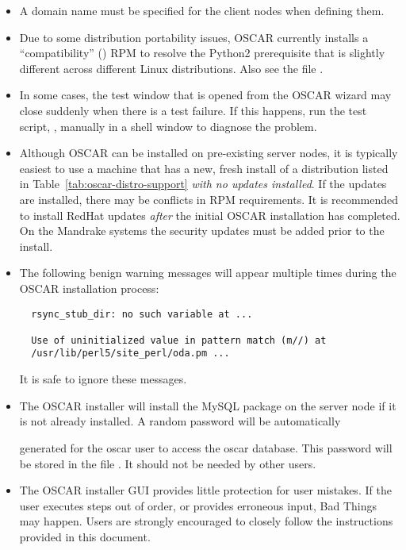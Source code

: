 \begin{itemize}
\item A domain name must be specified for the client nodes when
  defining them.

\item Due to some distribution portability issues, OSCAR currently installs
  a ``compatibility''  () RPM to resolve the
  Python2 prerequisite that is slightly different across different Linux
  distributions.  Also see the file .

\item In some cases, the test window that is opened from the
  OSCAR wizard may close suddenly when there is a test failure. If
  this happens, run the test script, ,
  manually in a shell window to diagnose the problem.

\item Although OSCAR can be installed on pre-existing server nodes, it
  is typically easiest to use a machine that has a new, fresh install
  of a distribution listed in Table~\ref{tab:oscar-distro-support}
  {\em with no updates installed}.  If the updates are installed,
  there may be conflicts in RPM requirements.  It is recommended to
  install RedHat updates {\em after} the initial OSCAR installation has
  completed.  On the Mandrake systems the security updates must be added
  prior to the install.

\item The following benign warning messages will appear multiple times
  during the OSCAR installation process:

\begin{verbatim}
  rsync_stub_dir: no such variable at ...

  Use of uninitialized value in pattern match (m//) at
  /usr/lib/perl5/site_perl/oda.pm ...
\end{verbatim}

  It is safe to ignore these messages.

\item The OSCAR installer will install the MySQL package on the server
  node if it is not already installed.  A random password will be automatically

  generated for the oscar user to access the oscar database.  This
  password will be stored in the file .  It should
  not be needed by other users.
\endchange

\item The OSCAR installer GUI provides little protection for user
  mistakes.  If the user executes steps out of order, or provides
  erroneous input, Bad Things may happen.  Users are strongly
  encouraged to closely follow the instructions provided in this
  document.


\end{itemize}
